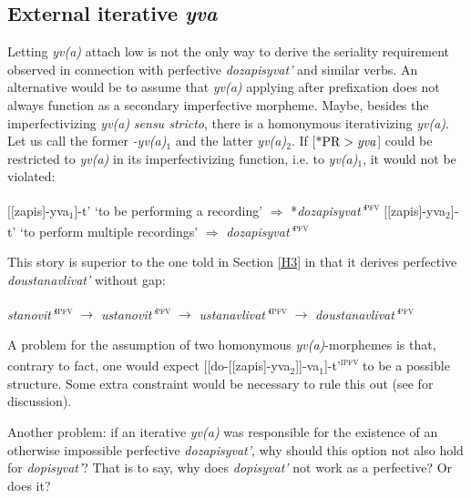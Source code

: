 \documentclass[output=paper,
colorlinks,
citecolor=brown,
newtxmath
]{langscibook}
\begin{document}

\subsection{External iterative \textit{yva}}\label{H4}\largerpage
\begin{sloppypar}
Letting \textit{yv(a)} attach low is not the only way to derive the seriality requirement observed in connection with perfective \textit{dozapisyvat'} and similar verbs. An alternative would be to assume that \textit{yv(a)} applying after prefixation does not always function as a secondary imperfective morpheme. Maybe, besides the imperfectivi\-zing  \textit{yv(a)} \textit{sensu stricto}, there is a homonymous iterativizing \textit{yv(a)}. Let us call the former \textit{-yv(a)}$_1$ and the latter \textit{yv(a)}$_2$. If [$\text{*PR}>\text{\textit{yva}}$] could be restricted to \textit{yv(a)} in its imperfectivizing function, i.e. to \textit{yv(a)}$_1$, it would not be violated:
\end{sloppypar}

\ea\label{poi}
\ea
$[[$zapis]-yva$_1$]-t' `to be performing a recording' $\Rightarrow$ *\textit{dozapisyvat'}\textsuperscript{\textsc{pfv}}
\ex $[[$zapis]-yva$_2$]-t' `to perform multiple recordings' $\Rightarrow$ \textsuperscript{}\textit{dozapisyvat'}\textsuperscript{\textsc{pfv}}
\z\z

\noindent This story is superior to the one told in Section \ref{H3} in that it derives perfective \textit{doustanavlivat'} without gap:

\ea
\textit{stanovit'}\textsuperscript{\textsc{ipfv}} $\rightarrow$ \textit{ustanovit'}\textsuperscript{\textsc{pfv}} $\rightarrow$ \textit{ustanavlivat'}\textsuperscript{\textsc{ipfv}} $\rightarrow$ \textit{doustanavlivat'}\textsuperscript{\textsc{pfv}}
\z

\noindent A problem for the assumption of two homonymous \textit{yv(a)}-morphemes is that, contrary to fact, one would expect [[do-[[zapis]-yva$_2$]]-va$_1$]-t'\textsuperscript{\textsc{ipfv}} to be a possible structure. Some extra constraint would be necessary to rule this out (see \citealt[64--65]{Tatevosov2013a} for discussion).

Another problem: if an iterative \textit{yv(a)} was responsible for the existence of an otherwise impossible perfective \textit{dozapisyvat'}, why should this option not also hold for \textit{dopisyvat'}?  That is to say, why does \textit{dopisyvat'} not work as a perfective? Or does it?
\end{document}
